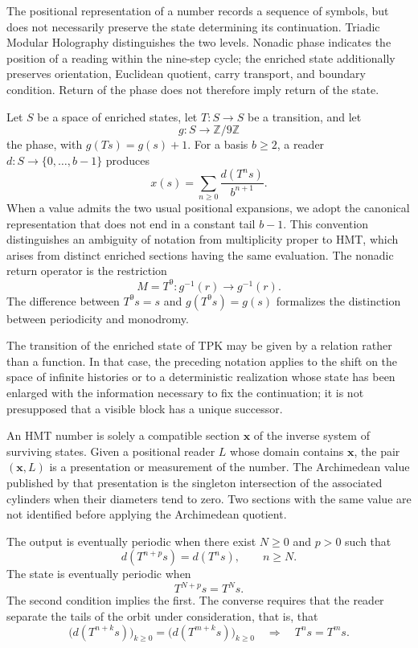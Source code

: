 \label{chap:taxonomia-monodromia}

The positional representation of a number records a sequence of symbols,
but does not necessarily preserve the state determining its continuation.
Triadic Modular Holography distinguishes the two levels. Nonadic phase indicates
the position of a reading within the nine-step cycle; the enriched
state additionally preserves orientation, Euclidean quotient, carry
transport, and boundary condition. Return of the phase does not therefore
imply return of the state.

Let \(S\) be a space of enriched states, let
\(T:S\to S\) be a transition, and let
\[
g:S\longrightarrow\mathbb Z/9\mathbb Z
\]
the phase, with \(g(Ts)=g(s)+1\). For a basis \(b\geq2\), a reader
\(d:S\to\{0,\ldots,b-1\}\) produces
\[
x(s)=\sum_{n\geq0}\frac{d(T^ns)}{b^{n+1}}.
\]
When a value admits the two usual positional expansions, we adopt the canonical representation that does not end in a constant tail \(b-1\). This convention distinguishes an ambiguity of notation from multiplicity proper to HMT, which arises from distinct enriched sections having the same evaluation.
The nonadic return operator is the restriction
\[
M=T^9:g^{-1}(r)\longrightarrow g^{-1}(r).
\]
The difference between \(T^9s=s\) and \(g(T^9s)=g(s)\) formalizes the distinction
between periodicity and monodromy.

The transition of the enriched state of TPK may be given by a relation rather than a
function. In that case, the preceding notation applies to the shift on
the space of infinite histories or to a deterministic realization whose state
has been enlarged with the information necessary to fix the continuation; it is not
presupposed that a visible block has a unique successor.

\begin{definition}
An HMT number is solely a compatible section
\(\boldsymbol x\) of the inverse system of surviving states. Given a
positional reader \(L\) whose domain contains \(\boldsymbol x\), the pair
\((\boldsymbol x,L)\) is a presentation or measurement of the number. The
Archimedean value published by that presentation is the singleton intersection of the
associated cylinders when their diameters tend to zero. Two sections with the
same value are not identified before applying the Archimedean quotient.
\end{definition}

\begin{definition}
The output is eventually periodic when there exist \(N\geq0\) and \(p>0\)
such that
\[
d(T^{n+p}s)=d(T^ns),\qquad n\geq N.
\]
The state is eventually periodic when
\[
T^{N+p}s=T^Ns.
\]
The second condition implies the first. The converse requires that the reader
separate the tails of the orbit under consideration, that is, that
\[
 \bigl(d(T^{n+k}s)\bigr)_{k\geq0}
 =\bigl(d(T^{m+k}s)\bigr)_{k\geq0}
 \quad\Longrightarrow\quad T^ns=T^ms.
\]
\end{definition}

